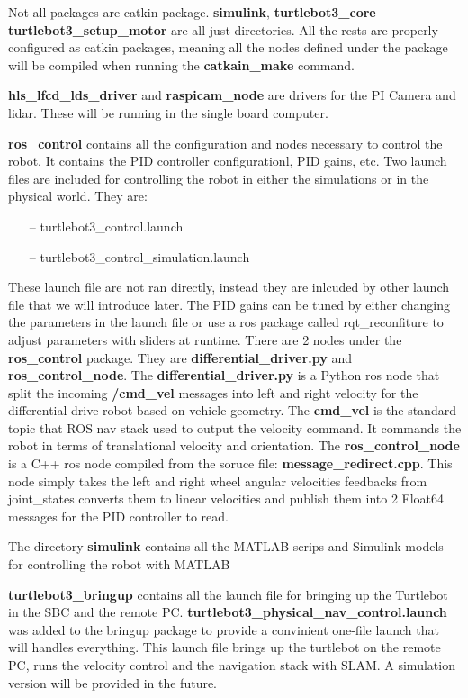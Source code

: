 \documentclass[12]{article}
\begin{document}
Not all packages are catkin package. \textbf{simulink}, \textbf{turtlebot3\_core} \textbf{turtlebot3\_setup\_motor} are all just directories. 
All the rests are properly configured as catkin packages, meaning all the nodes defined under the package will be compiled when running the \textbf{catkain\_make} command. 

\textbf{hls\_lfcd\_lds\_driver} and \textbf{raspicam\_node} are drivers for the PI Camera and lidar. 
These will be running in the single board computer. 

\textbf{ros\_control} contains all the configuration and nodes necessary to control the robot. 
It contains the PID controller configurationl, PID gains, etc.
Two launch files are included for controlling the robot in either the simulations or in the physical world. They are:

\begin{itemize}
	\item[--] turtlebot3\_control.launch
	\item[--] turtlebot3\_control\_simulation.launch
\end{itemize}  
These launch file are not ran directly, instead they are inlcuded by other launch file that we will introduce later.
The PID gains can be tuned by either changing the parameters in the launch file or use a ros package called rqt\_reconfiture to adjust parameters with sliders at runtime. 
There are 2 nodes under the \textbf{ros\_control} package. They are \textbf{differential\_driver.py} and \textbf{ros\_control\_node}. 
The \textbf{differential\_driver.py} is a Python ros node that split the incoming \textbf{\//cmd\_vel} messages into left and right velocity for the differential drive robot based on vehicle geometry. 
The \textbf{\/cmd\_vel} is the standard topic that ROS nav stack used to output the velocity command. It commands the robot in terms of translational velocity and orientation. 
The \textbf{ros\_control\_node} is a C++ ros node compiled from the soruce file: \textbf{message\_redirect.cpp}. 
This node simply takes the left and right wheel angular velocities feedbacks from \/joint\_states converts them to linear velocities and publish them into 2 Float64 messages for the PID controller to read.


The directory \textbf{simulink} contains all the MATLAB scrips and Simulink models for controlling the robot with MATLAB 

\textbf{turtlebot3\_bringup} contains all the launch file for bringing up the Turtlebot in the SBC and the remote PC. 
\textbf{turtlebot3\_physical\_nav\_control.launch} was added to the bringup package to provide a convinient one-file launch that will handles everything. 
This launch file brings up the turtlebot on the remote PC, runs the velocity control and the navigation stack with SLAM. A simulation version will be provided in the future.
\end{document}
